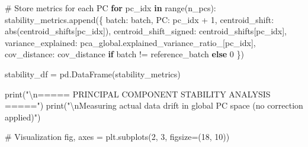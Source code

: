 \documentclass[
  letterpaper,
  DIV=11,
  numbers=noendperiod]{scrartcl}
\newenvironment{Shaded}{\begin{snugshade}}{\end{snugshade}}
\newcommand{\BuiltInTok}[1]{\textcolor[rgb]{0.00,0.23,0.31}{#1}}
\newcommand{\CharTok}[1]{\textcolor[rgb]{0.13,0.47,0.30}{#1}}
\newcommand{\CommentTok}[1]{\textcolor[rgb]{0.37,0.37,0.37}{#1}}
\newcommand{\ControlFlowTok}[1]{\textcolor[rgb]{0.00,0.23,0.31}{\textbf{#1}}}
\newcommand{\DecValTok}[1]{\textcolor[rgb]{0.68,0.00,0.00}{#1}}
\newcommand{\KeywordTok}[1]{\textcolor[rgb]{0.00,0.23,0.31}{\textbf{#1}}}
\newcommand{\NormalTok}[1]{\textcolor[rgb]{0.00,0.23,0.31}{#1}}
\newcommand{\OperatorTok}[1]{\textcolor[rgb]{0.37,0.37,0.37}{#1}}
\newcommand{\StringTok}[1]{\textcolor[rgb]{0.13,0.47,0.30}{#1}}
\renewenvironment{Shaded}{%
  \begin{tcolorbox}[%
    enhanced,%
    colback=codebg,%
    colframe=codebg,%
    borderline west={3pt}{0pt}{sectionblue},%
    fontupper=\small\ttfamily,%
    boxrule=0pt,%
    arc=0pt,%
    boxsep=5pt,%
    left=2mm,%
    right=2mm,%
    top=2mm,%
    bottom=2mm%
  ]%
}{%
  \end{tcolorbox}%
}
\begin{document}
\begin{Shaded}
\begin{Highlighting}[]
    \CommentTok{\# Store metrics for each PC}
    \ControlFlowTok{for}\NormalTok{ pc\_idx }\KeywordTok{in} \BuiltInTok{range}\NormalTok{(n\_pcs):}
\NormalTok{        stability\_metrics.append(\{}
            \StringTok{\textquotesingle{}batch\textquotesingle{}}\NormalTok{: batch,}
            \StringTok{\textquotesingle{}PC\textquotesingle{}}\NormalTok{: pc\_idx }\OperatorTok{+} \DecValTok{1}\NormalTok{,}
            \StringTok{\textquotesingle{}centroid\_shift\textquotesingle{}}\NormalTok{: }\BuiltInTok{abs}\NormalTok{(centroid\_shifts[pc\_idx]),}
            \StringTok{\textquotesingle{}centroid\_shift\_signed\textquotesingle{}}\NormalTok{: centroid\_shifts[pc\_idx],}
            \StringTok{\textquotesingle{}variance\_explained\textquotesingle{}}\NormalTok{: pca\_global.explained\_variance\_ratio\_[pc\_idx],}
            \StringTok{\textquotesingle{}cov\_distance\textquotesingle{}}\NormalTok{: cov\_distance }\ControlFlowTok{if}\NormalTok{ batch }\OperatorTok{!=}\NormalTok{ reference\_batch }\ControlFlowTok{else} \DecValTok{0}
\NormalTok{        \})}

\NormalTok{stability\_df }\OperatorTok{=}\NormalTok{ pd.DataFrame(stability\_metrics)}

\BuiltInTok{print}\NormalTok{(}\StringTok{"}\CharTok{\textbackslash{}n}\StringTok{===== PRINCIPAL COMPONENT STABILITY ANALYSIS ====="}\NormalTok{)}
\BuiltInTok{print}\NormalTok{(}\StringTok{"}\CharTok{\textbackslash{}n}\StringTok{Measuring actual data drift in global PC space (no correction applied)"}\NormalTok{)}

\CommentTok{\# Visualization}
\NormalTok{fig, axes }\OperatorTok{=}\NormalTok{ plt.subplots(}\DecValTok{2}\NormalTok{, }\DecValTok{3}\NormalTok{, figsize}\OperatorTok{=}\NormalTok{(}\DecValTok{18}\NormalTok{, }\DecValTok{10}\NormalTok{))}


\end{Highlighting}
\end{Shaded}
\end{document}
